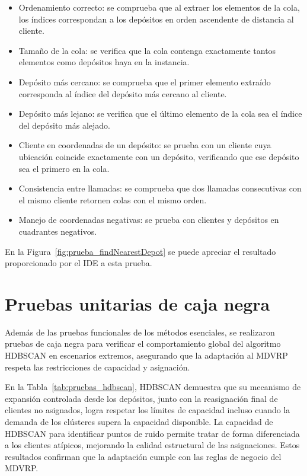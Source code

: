 \begin{itemize}
  \item Ordenamiento correcto: se comprueba que al extraer los elementos de la cola, los \'indices correspondan a los dep\'ositos en orden ascendente de distancia al cliente.
  \item Tama\~no de la cola: se verifica que la cola contenga exactamente tantos elementos como dep\'ositos haya en la instancia.
  \item Dep\'osito m\'as cercano: se comprueba que el primer elemento extra\'ido corresponda al \'indice del dep\'osito m\'as cercano al cliente.
  \item Dep\'osito m\'as lejano: se verifica que el \'ultimo elemento de la cola sea el \'indice del dep\'osito m\'as alejado.
  \item Cliente en coordenadas de un dep\'osito: se prueba con un cliente cuya ubicaci\'on coincide exactamente con un dep\'osito, verificando que ese dep\'osito sea el primero en la cola.
  \item Consistencia entre llamadas: se comprueba que dos llamadas consecutivas con el mismo cliente retornen colas con el mismo orden.
  \item Manejo de coordenadas negativas: se prueba con clientes y dep\'ositos en cuadrantes negativos.
\end{itemize}

En la Figura~\ref{fig:prueba_findNearestDepot} se puede apreciar el resultado proporcionado por el IDE a esta prueba.


\section{Pruebas unitarias de caja negra}

Adem\'as de las pruebas funcionales de los m\'etodos esenciales, se realizaron pruebas de caja negra para verificar el comportamiento global del algoritmo HDBSCAN en escenarios extremos, asegurando que la adaptaci\'on al MDVRP respeta las restricciones de capacidad y asignaci\'on.

En la Tabla~\ref{tab:pruebas_hdbscan}, HDBSCAN demuestra que su mecanismo de expansi\'on controlada desde los dep\'ositos, junto con la reasignaci\'on final de clientes no asignados, logra respetar los l\'imites de capacidad incluso cuando la demanda de los cl\'usteres supera la capacidad disponible. La capacidad de HDBSCAN para identificar puntos de ruido permite tratar de forma diferenciada a los clientes at\'ipicos, mejorando la calidad estructural de las asignaciones. Estos resultados confirman que la adaptaci\'on cumple con las reglas de negocio del MDVRP.

